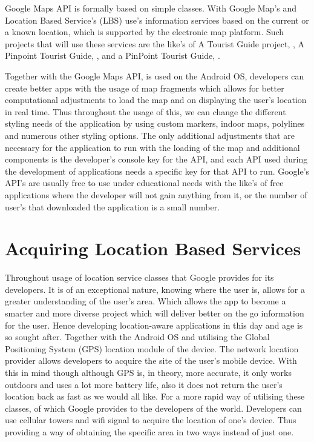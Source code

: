 Google Maps API is formally based on simple classes. With Google Map's and Location Based Service's (LBS) use's information services based on the current or a known location, which is supported by the electronic map platform. \cite{ren_dunham_2000} Such projects that will use these services are the like's of A Tourist Guide project, \cite{cheverst_davies_mitchell_friday_efstratiou_2000}, A Pinpoint Tourist Guide, \cite{wan_alagar_2006}, and a PinPoint Tourist Guide, \cite{cod72}. \par

Together with the Google Maps API, is used on the Android OS, developers can create better apps with the usage of map fragments which allows for better computational adjustments to load the map and on displaying the user's location in real time. Thus throughout the usage of this, we can change the different styling needs of the application by using custom markers, indoor maps, polylines and numerous other styling options. The only additional adjustments that are necessary for the application to run with the loading of the map and additional components is the developer's console key for the API, and each API used during the development of applications needs a specific key for that API to run. Google's API's are usually free to use under educational needs with the like's of free applications where the developer will not gain anything from it, or the number of user's that downloaded the application is a small number. \cite{sayed2005network}

\section{Acquiring Location Based Services}
Throughout usage of location service classes that Google provides for its developers. It is of an exceptional nature, knowing where the user is, allows for a greater understanding of the user's area. Which allows the app to become a smarter and more diverse project which will deliver better on the go information for the user. Hence developing location-aware applications in this day and age is so sought after. Together with the Android OS and utilising the Global Positioning System (GPS) location module of the device. The network location provider allows developers to acquire the site of the user's mobile device. With this in mind though although GPS is, in theory, more accurate, it only works outdoors and uses a lot more battery life, also it does not return the user's location back as fast as we would all like. For a more rapid way of utilising these classes, of which Google provides to the developers of the world. Developers can use cellular towers and wifi signal to acquire the location of one's device. Thus providing a way of obtaining the specific area in two ways instead of just one. \cite{ferraro2011location}

